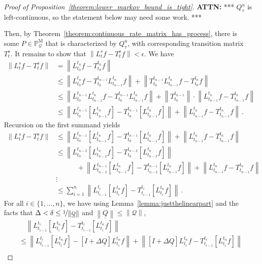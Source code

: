 \documentclass[10pt]{paper}
\theoremstyle{definition}
\newcommand{\processes}{\mathbb{P}}
\newcommand{\mprocesses}{\processes^{\mathrm{M}}}
\newcommand{\rateset}{\mathcal{Q}}
\newcommand{\lrate}{\underline{Q}}
\newcommand{\norm}[1]{\left\lVert #1 \right\rVert}
\begin{document}
\begin{proof}[Proof of Proposition~\ref{theorem:lower_markov_bound_is_tight}]
{\bf ATTN:} *** $Q_\tau^u$ is left-continuous, so the statement below may need some work. ***

Then, by Theorem~\ref{theorem:continuous_rate_matrix_has_process}, there is some $P\in\mprocesses_\mathcal{Q}$ that is characterized by $Q_\tau^u$, with corresponding transition matrix $T_t^s$. It remains to show that $\norm{L_t^sf - T_t^sf}<\epsilon$. We have
\begin{align*}
\norm{L_t^sf - T_t^sf} &= \norm{L_{t_0}^{t_n}f - T_{t_0}^{t_n}f} \\
 &\leq \norm{L_{t_0}^{t_n}f - T_{t_0}^{t_{n-1}}L_{t_{n-1}}^{t_n}f} + \norm{T_{t_0}^{t_{n-1}}L_{t_{n-1}}^{t_n}f - T_{t_0}^{t_n}f} \\
 &\leq \norm{L_{t_0}^{t_{n-1}}L_{t_{n-1}}^{t_n}f - T_{t_0}^{t_{n-1}}L_{t_{n-1}}^{t_n}f} + \norm{{T_{t_0}^{t_{n-1}}}}\cdot\norm{L_{t_{n-1}}^{t_n}f - T_{t_{n-1}}^{t_n}f} \\
 &\leq \norm{L_{t_0}^{t_{n-1}}\left[L_{t_{n-1}}^{t_n}f\right] - T_{t_0}^{t_{n-1}}\left[L_{t_{n-1}}^{t_n}f\right]} + \norm{L_{t_{n-1}}^{t_n}f - T_{t_{n-1}}^{t_n}f} \,.
\end{align*}
Recursion on the first summand yields
\begin{align*}
\norm{L_t^sf - T_t^sf} &\leq \norm{L_{t_0}^{t_{n-1}}\left[L_{t_{n-1}}^{t_n}f\right] - T_{t_0}^{t_{n-1}}\left[L_{t_{n-1}}^{t_n}f\right]} + \norm{L_{t_{n-1}}^{t_n}f - T_{t_{n-1}}^{t_n}f} \\
 &\leq \norm{L_{t_0}^{t_{n-2}}\left[L_{t_{n-2}}^{t_n}f\right] - T_{t_0}^{t_{n-2}}\left[L_{t_{n-2}}^{t_n}f\right]} \\
 &\quad\quad\quad+ \norm{L_{t_{n-2}}^{t_{n-1}}\left[L_{t_{n-1}}^{t_n}f\right] - T_{t_{n-2}}^{t_{n-1}}\left[L_{t_{n-1}}^{t_n}f\right]} + \norm{L_{t_{n-1}}^{t_n}f - T_{t_{n-1}}^{t_n}f} \\
&\vdots \\
 &\leq \sum_{i=1}^{n} \norm{L_{t_{i-1}}^{t_i}\left[L_{t_i}^{t_n}f\right] - T_{t_{i-1}}^{t_i}\left[L_{t_i}^{t_n}f\right]}\,.
\end{align*}
For all $i\in\{1,\ldots,n\}$, we have using Lemma~\ref{lemma:justthelinearpart} and the facts that $\Delta<\delta\leq\nicefrac{1}{\norm{\lrate}}$ and $\norm{\lrate}\leq\norm{\rateset}$,
\begin{align*}
&\quad \norm{L_{t_{i-1}}^{t_i}\left[L_{t_i}^{t_n}f\right] - T_{t_{i-1}}^{t_i}\left[L_{t_i}^{t_n}f\right]} \\
&\leq \norm{L_{t_{i-1}}^{t_i}\left[L_{t_i}^{t_n}f\right] - \left[I+\Delta\lrate\right]L_{t_i}^{t_n}f} + \norm{\left[I+\Delta\lrate\right]L_{t_i}^{t_n}f - T_{t_{i-1}}^{t_i}\left[L_{t_i}^{t_n}f\right]} \\

\end{align*}
\end{proof}
\end{document}
